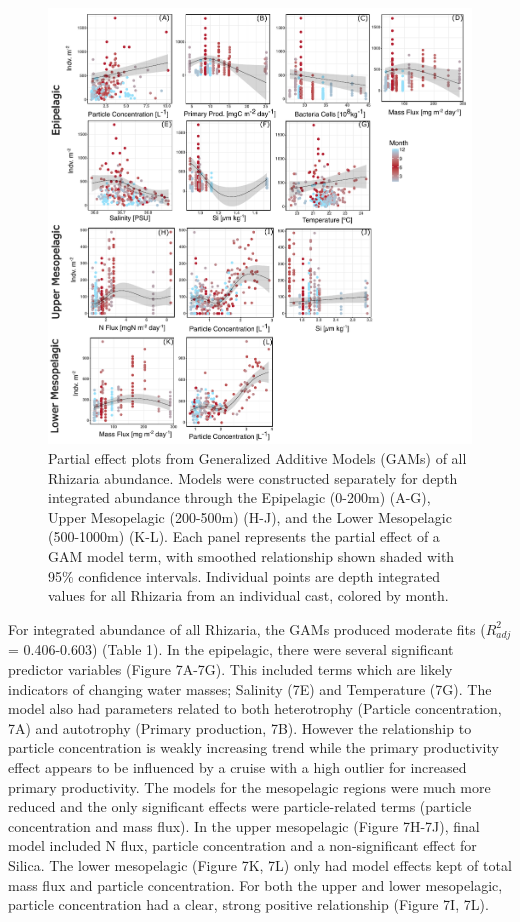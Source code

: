 \documentclass[
]{article}
\begin{document}
\begin{figure}

{\centering \includegraphics{images/06_tot-partials.pdf}

}

\caption{Partial effect plots from Generalized Additive Models (GAMs) of
all Rhizaria abundance. Models were constructed separately for depth
integrated abundance through the Epipelagic (0-200m) (A-G), Upper
Mesopelagic (200-500m) (H-J), and the Lower Mesopelagic (500-1000m)
(K-L). Each panel represents the partial effect of a GAM model term,
with smoothed relationship shown shaded with 95\% confidence intervals.
Individual points are depth integrated values for all Rhizaria from an
individual cast, colored by month.}

\end{figure}

For integrated abundance of all Rhizaria, the GAMs produced moderate
fits (\(R^2_{adj}\) = 0.406-0.603) (Table 1). In the epipelagic, there
were several significant predictor variables (Figure 7A-7G). This
included terms which are likely indicators of changing water masses;
Salinity (7E) and Temperature (7G). The model also had parameters
related to both heterotrophy (Particle concentration, 7A) and autotrophy
(Primary production, 7B). However the relationship to particle
concentration is weakly increasing trend while the primary productivity
effect appears to be influenced by a cruise with a high outlier for
increased primary productivity. The models for the mesopelagic regions
were much more reduced and the only significant effects were
particle-related terms (particle concentration and mass flux). In the
upper mesopelagic (Figure 7H-7J), final model included N flux, particle
concentration and a non-significant effect for Silica. The lower
mesopelagic (Figure 7K, 7L) only had model effects kept of total mass
flux and particle concentration. For both the upper and lower
mesopelagic, particle concentration had a clear, strong positive
relationship (Figure 7I, 7L).
\end{document}
